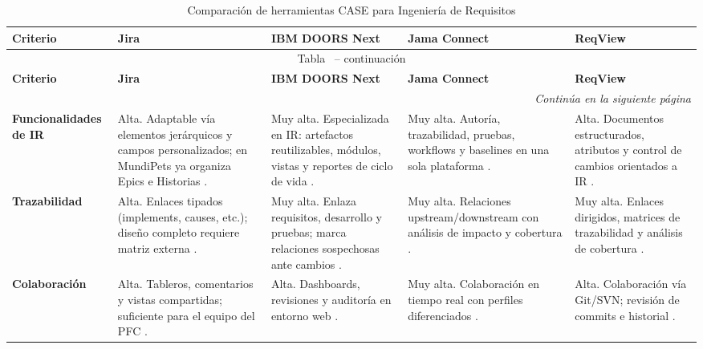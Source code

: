 \documentclass[journal,onecolumn]{IEEEtran}
\renewcommand{\thetable}{\arabic{table}}
\def\tablename{Tabla}
\begin{document}
	\begin{scriptsize}
		\begin{longtable}{p{1.7cm} p{3.05cm} p{3.05cm} p{3.05cm} p{3.05cm}}
			
			\caption{Comparación de herramientas CASE para Ingeniería de Requisitos}
			\label{tab:comparativa-case} \\
			
			\toprule
			\textbf{Criterio} & \textbf{Jira} & \textbf{IBM DOORS Next} & \textbf{Jama Connect} & \textbf{ReqView} \\
			\midrule
			\endfirsthead
			
			\multicolumn{5}{c}{\tablename\ \thetable{} -- continuación} \\
			\toprule
			\textbf{Criterio} & \textbf{Jira} & \textbf{IBM DOORS Next} & \textbf{Jama Connect} & \textbf{ReqView} \\
			\midrule
			\endhead
			
			\midrule
			\multicolumn{5}{r}{\textit{Continúa en la siguiente página}} \\
			\endfoot
			
			\bottomrule
			\endlastfoot
			
			\textbf{Funcionalidades de IR} &
			Alta. Adaptable vía elementos jerárquicos y campos personalizados; en
			MundiPets ya organiza Epics e Historias \cite{atlassian_link_work_items,atlassian_jira_pricing}. &
			Muy alta. Especializada en IR: artefactos reutilizables, módulos,
			vistas y reportes de ciclo de vida \cite{ibm_doors_overview}. &
			Muy alta. Autoría, trazabilidad, pruebas, workflows y baselines en una
			sola plataforma \cite{jama_features}. &
			Alta. Documentos estructurados, atributos y control de cambios
			orientados a IR \cite{reqview_traceability,reqview_quickstart}. \\[3pt]
			
			\textbf{Trazabilidad} &
			Alta. Enlaces tipados (implements, causes, etc.); diseño completo
			requiere matriz externa \cite{atlassian_link_work_items}. &
			Muy alta. Enlaza requisitos, desarrollo y pruebas; marca relaciones
			sospechosas ante cambios \cite{ibm_doors_traceability}. &
			Muy alta. Relaciones upstream/downstream con análisis de impacto y
			cobertura \cite{jama_features,jama_relationships}. &
			Muy alta. Enlaces dirigidos, matrices de trazabilidad y análisis de
			cobertura \cite{reqview_traceability}. \\[3pt]
			
			\textbf{Colaboración} &
			Alta. Tableros, comentarios y vistas compartidas; suficiente para el
			equipo del PFC \cite{atlassian_jira_pricing}. &
			Alta. Dashboards, revisiones y auditoría en entorno web
			\cite{ibm_doors_overview}. &
			Muy alta. Colaboración en tiempo real con perfiles diferenciados
			\cite{jama_features,jama_pricing}. &
			Alta. Colaboración vía Git/SVN; revisión de commits e historial
			\cite{reqview_git}. \\[3pt]
			

\end{longtable}
\end{scriptsize}
\end{document}
